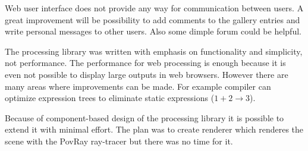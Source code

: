 Web user interface does not provide any way for communication between users.
A great improvement will be possibility to add comments to the gallery entries and write personal messages to other users.
Also some dimple forum could be helpful.

The \lsystem processing library was written with emphasis on functionality and simplicity, not performance.
The performance for web processing is enough because it is even not possible to display large outputs in web browsers.
However there are many areas where improvements can be made.
For example compiler can optimize expression trees to eliminate static expressions ($1 + 2 \rightarrow 3$).

Because of component-based design of the \lsystem processing library it is possible to extend it with minimal effort.
The plan was to create renderer which renderes the scene with the PovRay ray-tracer but there was no time for it.































